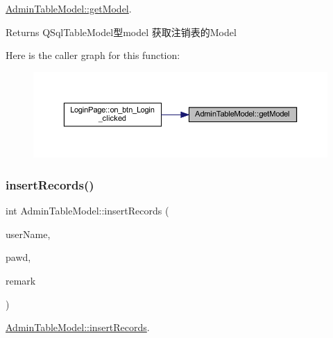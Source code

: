 \mbox{\hyperlink{class_admin_table_model_a67350532cce04df05f02baf1148d957b}{Admin\+Table\+Model\+::get\+Model}}. 

\begin{DoxyReturn}{Returns}
Q\+Sql\+Table\+Model型model 获取注销表的\+Model 
\end{DoxyReturn}
Here is the caller graph for this function\+:
\nopagebreak
\begin{figure}[H]
\begin{center}
\leavevmode
\includegraphics[width=350pt]{class_admin_table_model_a67350532cce04df05f02baf1148d957b_icgraph}
\end{center}
\end{figure}
\mbox{\label{class_admin_table_model_a42e5ffcf891cda90e417db09ba12bce7}} 
\subsubsection{\texorpdfstring{insertRecords()}{insertRecords()}}
{\footnotesize\ttfamily int Admin\+Table\+Model\+::insert\+Records (\begin{DoxyParamCaption}\item[{Q\+String}]{user\+Name,  }\item[{Q\+String}]{pawd,  }\item[{Q\+String}]{remark }\end{DoxyParamCaption})}



\mbox{\hyperlink{class_admin_table_model_a42e5ffcf891cda90e417db09ba12bce7}{Admin\+Table\+Model\+::insert\+Records}}. 


